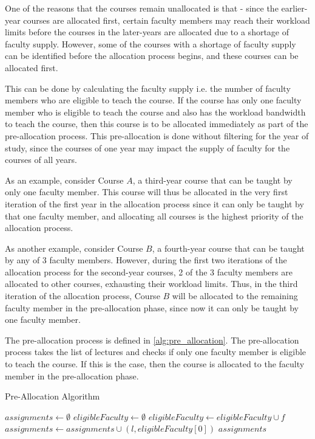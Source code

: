 One of the reasons that the courses remain unallocated is that - since the earlier-year courses are allocated first, certain faculty members may reach their workload limits before the courses in the later-years are allocated due to a shortage of faculty supply. However, some of the courses with a shortage of faculty supply can be identified before the allocation process begins, and these courses can be allocated first.

This can be done by calculating the faculty supply i.e. the number of faculty members who are eligible to teach the course. If the course has only one faculty member who is eligible to teach the course and also has the workload bandwidth to teach the course, then this course is to be allocated immediately as part of the pre-allocation process. This pre-allocation is done without filtering for the year of study, since the courses of one year may impact the supply of faculty for the courses of all years.

As an example, consider Course $A$, a third-year course that can be taught by only one faculty member. This course will thus be allocated in the very first iteration of the first year in the allocation process since it can only be taught by that one faculty member, and allocating all courses is the highest priority of the allocation process.

As another example, consider Course $B$, a fourth-year course that can be taught by any of 3 faculty members. However, during the first two iterations of the allocation process for the second-year courses, 2 of the 3 faculty members are allocated to other courses, exhausting their workload limits. Thus, in the third iteration of the allocation process, Course $B$ will be allocated to the remaining faculty member in the pre-allocation phase, since now it can only be taught by one faculty member.

The pre-allocation process is defined in \autoref{alg:pre_allocation}. The pre-allocation process takes the list of lectures and checks if only one faculty member is eligible to teach the course. If this is the case, then the course is allocated to the faculty member in the pre-allocation phase.

\begin{algorithm}[H]
  \caption{Pre-Allocation Algorithm}
  \begin{algorithmic}[1]
    \State $assignments \gets \emptyset$
    \State $eligibleFaculty \gets \emptyset$
    \State $eligibleFaculty \gets eligibleFaculty \cup f$
    \EndIf
    \EndFor
    \State $assignments \gets assignments \cup (l, eligibleFaculty[0])$
    \EndIf
    \EndFor
    \State \Return $assignments$
    \EndProcedure
  \end{algorithmic}
  \label{alg:pre_allocation}
\end{algorithm}

